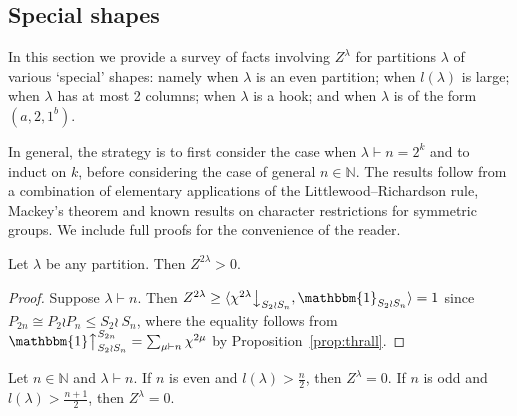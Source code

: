 \documentclass[ALCO, Unicode]{cedram}
\newcommand{\triv}{\mathbbm{1}}
\newcommand{\down}{\big\downarrow}
\newcommand{\up}{\big\uparrow}
\newcommand{\N}{\mathbb{N}}
\begin{document}
\subsection{Special shapes}\label{sec:special-shapes}
In this section we provide a survey of facts involving $Z^\lambda$ for partitions $\lambda$ of various `special' shapes: namely when $\lambda$ is an even partition; when $l(\lambda)$ is large; when $\lambda$ has at most 2 columns; when $\lambda$ is a hook; and when $\lambda$ is of the form $(a,2,1^b)$. 

In general, the strategy is to first consider the case when $\lambda\vdash n=2^k$ and to induct on $k$, before considering the case of general $n\in\N$. The results follow from a combination of elementary applications of the Littlewood--Richardson rule, Mackey's theorem and known results on character restrictions for symmetric groups. We include full proofs for the convenience of the reader.

\begin{lemma}
	Let $\lambda$ be any partition. Then $Z^{2\lambda}>0$.
\end{lemma}

\begin{proof}
	Suppose $\lambda\vdash n$. Then $Z^{2\lambda} \ge \langle \chi^{2\lambda}\down_{S_2\wr S_n},\triv_{S_2\wr S_n}\rangle=1$ since $P_{2n}\cong P_2\wr P_n\le S_2\wr~S_n$, where the equality follows from $\triv\up_{S_2\wr S_n}^{S_{2n}} = \sum_{\mu\vdash n} \chi^{2\mu}$ by Proposition~\ref{prop:thrall}.
\end{proof}

\begin{lemma}\label{lem:tall}
	Let $n\in\N$ and $\lambda\vdash n$. If $n$ is even and $l(\lambda)>\frac{n}{2}$, then $Z^\lambda=0$. If $n$ is odd and $l(\lambda)>\frac{n+1}{2}$, then $Z^\lambda=0$.
\end{lemma}
\end{document}
